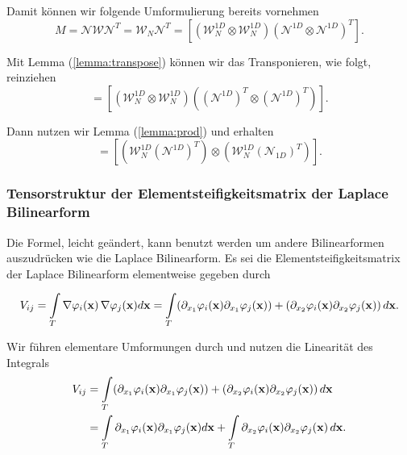Damit können wir folgende Umformulierung bereits vornehmen
\begin{equation}
M= \mathcal{N} \mathcal{W} \mathcal{N}^T= \mathcal{W}_N \mathcal{N}^T =  [(\mathcal{W}_N^{1D} \otimes \mathcal{W}_N^{1D})  (\mathcal{N}^{1D} \otimes \mathcal{N}^{1D})^T].
\end{equation}

Mit Lemma (\ref{lemma:transpose}) können wir das Transponieren, wie folgt, reinziehen
\begin{equation}
[(\mathcal{W}_N^{1D} \otimes \mathcal{W}_N^{1D})  (\mathcal{N}^{1D} \otimes \mathcal{N}^{1D})^T]=
[(\mathcal{W}_N^{1D} \otimes \mathcal{W}_N^{1D})  ((\mathcal{N}^{1D})^T \otimes (\mathcal{N}^{1D})^T)].
\end{equation}

Dann nutzen wir Lemma (\ref{lemma:prod}) und erhalten
\begin{equation}
 [(\mathcal{W}_N^{1D} \otimes \mathcal{W}_N^{1D})  ((\mathcal{N}^{1D})^T \otimes (\mathcal{N}_{1D})^T)]= [(\mathcal{W}_N^{1D} (\mathcal{N}^{1D})^T) \otimes (\mathcal{W}_N^{1D} (\mathcal{N}_{1D})^T)].
\end{equation}

\newpage
\subsubsection{Tensorstruktur der Elementsteifigkeitsmatrix der Laplace Bilinearform}
Die Formel, leicht geändert, kann benutzt werden um andere Bilinearformen auszudrücken wie die Laplace Bilinearform.  Es sei die Elementsteifigkeitsmatrix der Laplace Bilinearform elementweise gegeben durch

\begin{equation}
V_{ij} = \int\limits_{T} \nabla \varphi_i(\bold{x}) \, \nabla \varphi_j(\bold{x})  d \bold{x}=\int\limits_{T}( \partial_{x_1}  \varphi_i(\bold{x})  \partial_{x_1} \varphi_j(\bold{x})) + ( \partial_{x_2} \varphi_i(\bold{x})  \partial_{x_2} \varphi_j(\bold{x})) \, d\bold{x}.
\end{equation}

Wir führen elementare Umformungen durch und nutzen die Linearität des Integrals
\begin{equation}
\begin{aligned}
V_{ij} &= \int\limits_{T}( \partial_{x_1}  \varphi_i(\bold{x})  \partial_{x_1} \varphi_j(\bold{x})) + ( \partial_{x_2} \varphi_i(\bold{x})  \partial_{x_2} \varphi_j(\bold{x})) \, d\bold{x} \\ &= \int\limits_{T} \partial_{x_1}  \varphi_i(\bold{x})  \partial_{x_1} \varphi_j(\bold{x}) d\bold{x} + \int\limits_{T}  \partial_{x_2} \varphi_i(\bold{x})  \partial_{x_2} \varphi_j(\bold{x}) \, d\bold{x}.
\end{aligned}
\end{equation}

